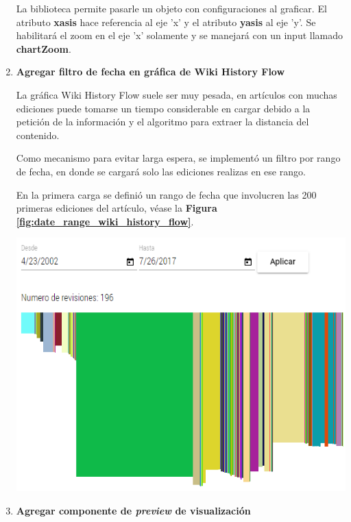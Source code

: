 \begin{enumerate}
  La biblioteca permite pasarle un objeto con configuraciones al graficar. El atributo \textbf{xasis} hace referencia al eje 'x' y el atributo \textbf{yasis} al eje 'y'. Se habilitará el zoom en el eje 'x' solamente y se manejará con un input llamado \textbf{chartZoom}.
  
  \smallbreak
  \item\textbf{Agregar filtro de fecha en gráfica de Wiki History Flow}
  \smallbreak
  
  La gráfica Wiki History Flow suele ser muy pesada, en artículos con muchas ediciones puede tomarse un tiempo considerable en cargar debido a la petición de la información y el algoritmo para extraer la distancia del contenido.
  
  Como mecanismo para evitar larga espera, se implementó un filtro por rango de fecha, en donde se cargará solo las ediciones realizas en ese rango.
  
  En la primera carga se definió un rango de fecha que involucren las 200 primeras ediciones del artículo, véase la \textbf{Figura \ref{fig:date_range_wiki_history_flow}}.

  \begin{center}
    \bigbreak
    \includegraphics[scale=0.35]{images/marco_aplicativo/date_range_wiki_history_flow.png}
    \label{fig:date_range_wiki_history_flow}
    \bigbreak
  \end{center}
  
  \smallbreak
  \item\textbf{Agregar componente de \textit{preview} de visualización}
  \smallbreak


\end{enumerate}

